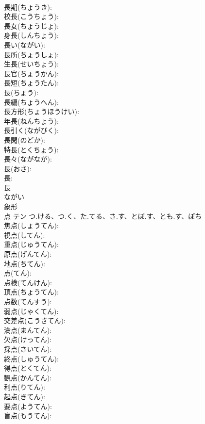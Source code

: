 \documentclass[8pt]{extreport}
\begin{document}
\begin{CJK}{UTF8}{min}
\\	長期(ちょうき): 
\\	校長(こうちょう): 
\\	長女(ちょうじょ): 
\\	身長(しんちょう): 
\\	長い(ながい): 
\\	長所(ちょうしょ): 
\\	生長(せいちょう): 
\\	長官(ちょうかん): 
\\	長短(ちょうたん): 
\\	長(ちょう): 
\\	長編(ちょうへん): 
\\	長方形(ちょうほうけい): 
\\	年長(ねんちょう): 
\\	長引く(ながびく): 
\\	長閑(のどか): 
\\	特長(とくちょう): 
\\	長々(ながなが): 
\\	長(おさ): 
\\	長: 
\\	長	
\\	ながい	
\\	象形 
\\	点	テン	つ.ける、つ.く、た.てる、さ.す、とぼ.す、とも.す、ぼち		
\\	焦点(しょうてん): 
\\	視点(してん): 
\\	重点(じゅうてん): 
\\	原点(げんてん): 
\\	地点(ちてん): 
\\	点(てん): 
\\	点検(てんけん): 
\\	頂点(ちょうてん): 
\\	点数(てんすう): 
\\	弱点(じゃくてん): 
\\	交差点(こうさてん): 
\\	満点(まんてん): 
\\	欠点(けってん): 
\\	採点(さいてん): 
\\	終点(しゅうてん): 
\\	得点(とくてん): 
\\	観点(かんてん): 
\\	利点(りてん): 
\\	起点(きてん): 
\\	要点(ようてん): 
\\	盲点(もうてん): 

\end{CJK}
\end{document}
